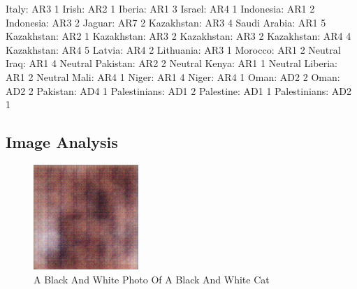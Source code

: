 \documentclass{article}%
\begin{document}
Italy: AR3 1\newline%
Irish: AR2 1\newline%
Iberia: AR1 3\newline%
Israel: AR4 1\newline%
Indonesia: AR1 2\newline%
Indonesia: AR3 2\newline%
Jaguar: AR7 2\newline%
Kazakhstan: AR3 4\newline%
Saudi Arabia: AR1 5\newline%
Kazakhstan: AR2 1\newline%
Kazakhstan: AR3 2\newline%
Kazakhstan: AR3 2\newline%
Kazakhstan: AR4 4\newline%
Kazakhstan: AR4 5\newline%
Latvia: AR4 2\newline%
Lithuania: AR3 1\newline%
Morocco: AR1 2\newline%
Neutral Iraq: AR1 4\newline%
Neutral Pakistan: AR2 2\newline%
Neutral Kenya: AR1 1\newline%
Neutral Liberia: AR1 2\newline%
Neutral Mali: AR4 1\newline%
Niger: AR1 4\newline%
Niger: AR4 1\newline%
Oman: AD2 2\newline%
Oman: AD2 2\newline%
Pakistan: AD4 1\newline%
Palestinians: AD1 2\newline%
Palestine: AD1 1\newline%
Palestinians: AD2 1

%
\subsection{Image Analysis}%
\label{subsec:ImageAnalysis}%


\begin{figure}[h!]%
\centering%
\includegraphics[width=150px]{500_fake_images/samples_5_313.png}%
\caption{A Black And White Photo Of A Black And White Cat}%
\end{figure}

%
\end{document}
